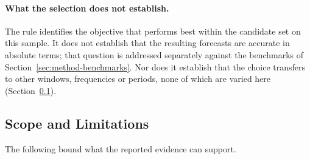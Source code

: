 \documentclass[12pt]{article}
\begin{document}
\paragraph{What the selection does not establish.}
The rule identifies the objective that performs best within the candidate set on
this sample. It does not establish that the resulting forecasts are accurate in
absolute terms; that question is addressed separately against the benchmarks of
Section~\ref{sec:method-benchmarks}. Nor does it establish that the choice
transfers to other windows, frequencies or periods, none of which are varied
here (Section~\ref{sec:method-scope}).

\subsection{Scope and Limitations}
\label{sec:method-scope}

The following bound what the reported evidence can support.
\end{document}
